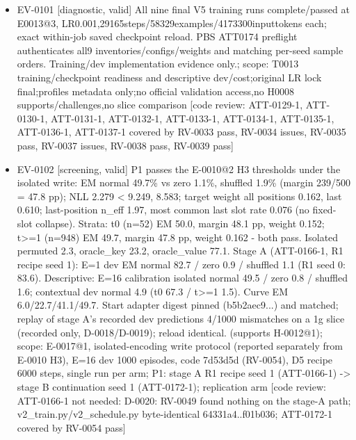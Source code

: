 \documentclass[11pt]{article}
\begin{document}
\begin{itemize}
\item EV-0101 [diagnostic, valid] All nine final V5 training runs complete/passed at E0013@3, LR0.001,29165steps/58329examples/4173300inputtokens each; exact within-job saved checkpoint reload. PBS ATT0174 preflight authenticates all9 inventories/configs/weights and matching per-seed sample orders. Training/dev implementation evidence only.; scope: T0013 training/checkpoint readiness and descriptive dev/cost;original LR lock final;profiles metadata only;no official validation access,no H0008 supports/challenges,no slice comparison [code review: ATT-0129-1, ATT-0130-1, ATT-0131-1, ATT-0132-1, ATT-0133-1, ATT-0134-1, ATT-0135-1, ATT-0136-1, ATT-0137-1 covered by RV-0033 pass, RV-0034 issues, RV-0035 pass, RV-0037 issues, RV-0038 pass, RV-0039 pass]
\item EV-0102 [screening, valid] P1 passes the E-0010@2 H3 thresholds under the isolated write: EM normal 49.7\% vs zero 1.1\%, shuffled 1.9\% (margin 239/500 = 47.8 pp); NLL 2.279 \textless{} 9.249, 8.583; target weight all positions 0.162, last 0.610; last-position n\_eff 1.97, most common last slot rate 0.076 (no fixed-slot collapse). Strata: t0 (n=52) EM 50.0, margin 48.1 pp, weight 0.152; t\textgreater{}=1 (n=948) EM 49.7, margin 47.8 pp, weight 0.162 - both pass. Isolated permuted 2.3, oracle\_key 23.2, oracle\_value 77.1. Stage A (ATT-0166-1, R1 recipe seed 1): E=1 dev EM normal 82.7 / zero 0.9 / shuffled 1.1 (R1 seed 0: 83.6). Descriptive: E=16 calibration isolated normal 49.5 / zero 0.8 / shuffled 1.6; contextual dev normal 4.9 (t0 67.3 / t\textgreater{}=1 1.5). Curve EM 6.0/22.7/41.1/49.7. Start adapter digest pinned (b5b2aec9...) and matched; replay of stage A's recorded dev predictions 4/1000 mismatches on a 1g slice (recorded only, D-0018/D-0019); reload identical. (supports H-0012@1); scope: E-0017@1, isolated-encoding write protocol (reported separately from E-0010 H3), E=16 dev 1000 episodes, code 7d53d5d (RV-0054), D5 recipe 6000 steps, single run per arm; P1: stage A R1 recipe seed 1 (ATT-0166-1) -\textgreater{} stage B continuation seed 1 (ATT-0172-1); replication arm [code review: ATT-0166-1 not needed: D-0020: RV-0049 found nothing on the stage-A path; v2\_train.py/v2\_schedule.py byte-identical 64331a4..f01b036; ATT-0172-1 covered by RV-0054 pass]

\end{itemize}
\end{document}
